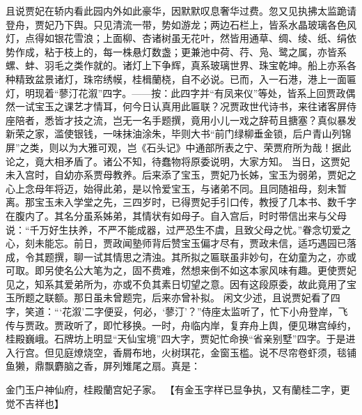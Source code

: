 \documentclass[12pt,oneside]{book}
\begin{document}
且说贾妃在轿内看此园内外如此豪华，因默默叹息奢华过费。忽又见执拂太监跪请登舟，贾妃乃下舆。只见清流一带，势如游龙；两边石栏上，皆系水晶玻璃各色风灯，点得如银花雪浪；上面柳、杏诸树虽无花叶，然皆用通草、绸、绫、纸、绢依势作成，粘于枝上的，每一株悬灯数盏；更兼池中荷、荇、凫、鹭之属，亦皆系螺、蚌、羽毛之类作就的。诸灯上下争辉，真系玻璃世界、珠宝乾坤。船上亦系各种精致盆景诸灯，珠帘绣幙，桂楫蘭桡，自不必说。已而，入一石港，港上一面匾灯，明现着“蓼汀花溆”四字。——按：此四字并“有凤来仪”等处，皆系上回贾政偶然一试宝玉之课艺才情耳，何今日认真用此匾联？况贾政世代诗书，来往诸客屏侍座陪者，悉皆才技之流，岂无一名手题撰，竟用小儿一戏之辞苟且搪塞？真似暴发新荣之家，滥使银钱，一味抹油涂朱，毕则大书“前门绿柳垂金锁，后户青山列锦屏”之类，则以为大雅可观，岂《石头记》中通部所表之宁、荣贾府所为哉！据此论之，竟大相矛盾了。诸公不知，待蠢物将原委说明，大家方知。
当日，这贾妃未入宫时，自幼亦系贾母教养。后来添了宝玉，贾妃乃长姊，宝玉为弱弟，贾妃之心上念母年将迈，始得此弟，是以怜爱宝玉，与诸弟不同。且同随祖母，刻未暂离。那宝玉未入学堂之先，三四岁时，已得贾妃手引口传，教授了几本书、数千字在腹内了。其名分虽系姊弟，其情状有如母子。自入宫后，时时带信出来与父母说：“千万好生扶养，不严不能成器，过严恐生不虞，且致父母之忧。”眷念切爱之心，刻未能忘。前日，贾政闻塾师背后赞宝玉偏才尽有，贾政未信，适巧遇园已落成，令其题撰，聊一试其情思之清浊。其所拟之匾联虽非妙句，在幼童为之，亦或可取。即另使名公大笔为之，固不费难，然想来倒不如这本家风味有趣。更使贾妃见之，知系其爱弟所为，亦或不负其素日切望之意。因有这段原委，故此竟用了宝玉所题之联额。那日虽未曾题完，后来亦曾补拟。
闲文少述，且说贾妃看了四字，笑道：“‘花溆’二字便妥，何必，‘蓼汀’？”侍座太监听了，忙下小舟登岸，飞传与贾政。贾政听了，即忙移换。一时，舟临内岸，复弃舟上舆，便见琳宫绰约，桂殿巍峨。石牌坊上明显“天仙宝境”四大字，贾妃忙命换“省亲别墅”四字。于是进入行宫。但见庭燎烧空，香屑布地，火树琪花，金窗玉槛。说不尽帘卷虾须，毯铺鱼獭，鼎飘麝脑之香，屏列雉尾之扇。真是：

金门玉户神仙府，桂殿蘭宫妃子家。
【有金玉字样已显争执，又有蘭桂二字，更觉不吉祥也】
\end{document}
